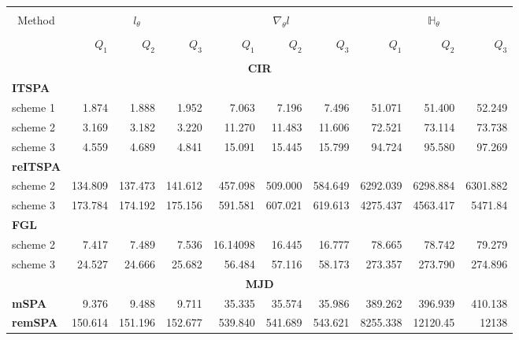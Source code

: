 \begin{table}
	\newcommand{\ra}[1]{\renewcommand{\arraystretch}{#1}}
	\ra{1.3}
	\centering
	{\setlength{\tabcolsep}{0.20em}
		\begin{tabular}{@{}lrrrrrrrrr@{}}
			\toprule\\
			\multicolumn{1}{c}{Method} & \multicolumn{3}{c}{$l_\theta$} & \multicolumn{3}{c}{$\nabla_\theta l$} & \multicolumn{3}{c}{$\mathbb{H}_\theta$}\\
			\cmidrule(r){1-1}	\cmidrule(r){2-4} 	\cmidrule(r){5-7} 	\cmidrule(r){8-10}\\
			& $Q_1$ & $Q_2$ & $Q_3$ & $Q_1$ & $Q_2$ & $Q_3$ & $Q_1$ & $Q_2$ & $Q_3$  \\
			\midrule\\
			
			\multicolumn{10}{c}{\textbf{CIR}}\\
			
			\textbf{ITSPA}\\
			scheme 1 & 1.874 & 1.888 & 1.952 & 7.063  & 7.196 & 7.496 & 51.071  & 51.400 & 52.249 \\
			scheme 2 & 3.169 &3.182 &3.220 &     11.270&11.483 &11.606 &   72.521 &73.114 &73.738  \\
			scheme 3 &   4.559  &4.689 &4.841 &       15.091 & 15.445 &15.799 &  94.724 & 95.580 &97.269  \\
			
			\textbf{reITSPA}           \\
			scheme 2 &   134.809 &137.473 &141.612 &  457.098  &509.000 &584.649 &  6292.039 & 6298.884 &6301.882      \\
			scheme 3 &  173.784 &174.192 &175.156 &  591.581 &607.021 &619.613 &  4275.437 &  4563.417 & 5471.84      \\
			
			\textbf{FGL}\\
			scheme 2 & 7.417 & 7.489 &7.536 &   16.14098 &16.445 &16.777 & 78.665 &78.742 &79.279          \\
			scheme 3 &  24.527&24.666 &25.682 &   56.484 &57.116 &58.173 &  273.357&273.790 &274.896        \\
			
			\multicolumn{10}{c}{\textbf{MJD}}\\
			
			\textbf{mSPA} & 9.376 &9.488 & 9.711 & 35.335 & 35.574 & 35.986 & 389.262 &396.939 &410.138  \\
			
			\textbf{remSPA} & 150.614 &151.196 &152.677 &   539.840 &541.689 &543.621 &  8255.338 &12120.45 &12138  \\
			

\end{tabular}}
\end{table}
